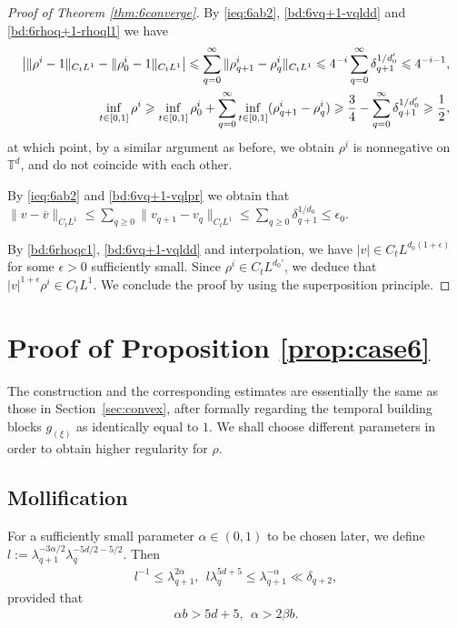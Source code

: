 \documentclass[10pt,a4paper]{amsart}
\numberwithin{equation}{section}
\def\geq{\geqslant}
\def\leq{\leqslant}
\def\geq{\geqslant}
\def\leq{\leqslant}
\begin{document}
\begin{proof}[Proof of Theorem \ref{thm:6converge}]
 By \eqref{ieq:6ab2}, \eqref{bd:6vq+1-vqldd} and \eqref{bd:6rhoq+1-rhoql1} we have
\begin{align} 
 \left|   \|\rho^i-1\|_{C_tL^1}- \| \rho^{i}_0-1\|_{C_tL^1}\right|\leq \sum_{q=0}^\infty\|\rho^{i}_{q+1}-\rho^{i}_{q}\|_{C_tL^1}\leq
4^{-i}\sum_{q=0}^\infty\delta_{q+1}^{1/{d_0'}}\leq 4^{-i-1},\\
\inf_{t\in [0,1]}\rho^i \geq \inf_{t\in [0,1]} \rho_0^i +
\sum_{q=0}^\infty \inf_{t\in [0,1]}(\rho_{q+1}^i- \rho_q^i) \geq\frac34-\sum_{q=0}^\infty \delta_{q+1}^{1/d_0'}\geq \frac12,\notag
\end{align}
at which point, by a similar argument as before,  we obtain 
 $\rho^{i}$ is nonnegative on $\mathbb{T}^d$, and do not coincide with each other. 

By \eqref{ieq:6ab2} and \eqref{bd:6vq+1-vqlpr} we obtain that $ \|v -\overline v \|_{C_tL^1}\leq  \sum_{q\geq0} \|v_{q+1}-v_q\|_{C_tL^1}\leq
\sum_{q\geq0}\delta_{q+1}^{1/d_0}\leq\epsilon_0.$ 

    By \eqref{bd:6rhoqc1}, \eqref{bd:6vq+1-vqldd} and interpolation, we have $|v| \in C_tL^{d_0(1+\epsilon)}$ for some $\epsilon > 0$ sufficiently small. Since $\rho^i \in C_tL^{d_0'}$, we deduce that $|v|^{1+\epsilon} \rho^i \in C_tL^{1}$. We conclude the proof by using the superposition principle.
\end{proof}
 

\section{Proof of Proposition \ref{prop:case6}}\label{sec:6convex}

The construction and the corresponding estimates are essentially the same as those in Section~\ref{sec:convex}, after formally regarding the temporal building blocks $g_{(\xi)}$ as identically equal to $1$.
 We shall choose different parameters in order to obtain higher regularity for $\rho$.


\subsection{Mollification}
For a sufficiently small parameter $\alpha\in(0,1)$ to be chosen later, we define
$
l:=\lambda_{q+1}^{-3\alpha/2}\lambda_q^{-5d/2-5/2}.
$
Then
\begin{align}
l^{-1}
\leq
\lambda_{q+1}^{2\alpha},
 \ \
l\lambda_q^{5d+5}
\leq
\lambda_{q+1}^{-\alpha} 
\ll
\delta_{q+2},
\label{para62}
\end{align}
provided that
\begin{align}
\alpha b>5d+5,
\ \
\alpha>2\beta b.
\label{alphab>6}
\end{align}
\end{document}
